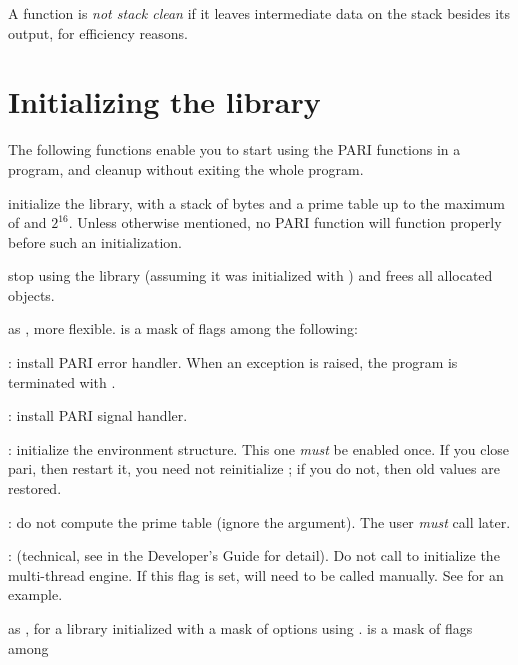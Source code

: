 A function is \emph{not stack clean} if it leaves intermediate data on the
stack besides its output, for efficiency reasons.

\section{Initializing the library}

The following functions enable you to start using the PARI functions
in a program, and cleanup without exiting the whole program.


 initialize the
library, with a stack of  bytes and a prime table
up to the maximum of  and $2^{16}$. Unless otherwise
mentioned, no PARI function will function properly before such an
initialization.

 stop using the library (assuming it was
initialized with ) and frees all allocated objects.

\label{se:pari_init_tech}

 as
, more flexible.  is a mask of flags
among the following:

  : install PARI error handler. When an exception is
raised, the program is terminated with .

  : install PARI signal handler.

  : initialize the  environment structure.
This one \emph{must} be enabled once. If you close pari, then restart it,
you need not reinitialize ; if you do not, then old values are
restored.

  : do not compute the prime table (ignore the
   argument). The user \emph{must} call
   later.

  : (technical, see  in the Developer's
Guide for detail). Do not call  to initialize the
multi-thread engine. If this flag is set,  will need to
be called manually. See  for an example.

 as ,
for a library initialized with a mask of options using
.  is a mask of flags among

